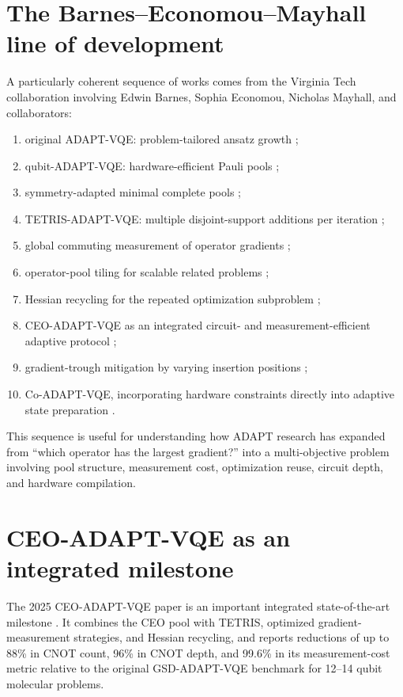\documentclass[11pt]{article}
\begin{document}
\section{The Barnes--Economou--Mayhall line of development}

A particularly coherent sequence of works comes from the Virginia Tech collaboration involving Edwin Barnes, Sophia Economou, Nicholas Mayhall, and collaborators:
\begin{enumerate}[leftmargin=2em]
    \item original ADAPT-VQE: problem-tailored ansatz growth \cite{Grimsley2019};
    \item qubit-ADAPT-VQE: hardware-efficient Pauli pools \cite{Tang2021};
    \item symmetry-adapted minimal complete pools \cite{Shkolnikov2023};
    \item TETRIS-ADAPT-VQE: multiple disjoint-support additions per iteration \cite{Anastasiou2024TETRIS};
    \item global commuting measurement of operator gradients \cite{Anastasiou2023};
    \item operator-pool tiling for scalable related problems \cite{VanDyke2024};
    \item Hessian recycling for the repeated optimization subproblem \cite{Ramoa2025Hessian};
    \item CEO-ADAPT-VQE as an integrated circuit- and measurement-efficient adaptive protocol \cite{Ramoa2025CEO};
    \item gradient-trough mitigation by varying insertion positions \cite{Stadelmann2025};
    \item Co-ADAPT-VQE, incorporating hardware constraints directly into adaptive state preparation \cite{Ramoa2026CoDesign}.
\end{enumerate}
This sequence is useful for understanding how ADAPT research has expanded from ``which operator has the largest gradient?'' into a multi-objective problem involving pool structure, measurement cost, optimization reuse, circuit depth, and hardware compilation.

\section{CEO-ADAPT-VQE as an integrated milestone}

The 2025 CEO-ADAPT-VQE paper is an important integrated state-of-the-art milestone \cite{Ramoa2025CEO}. It combines the CEO pool with TETRIS, optimized gradient-measurement strategies, and Hessian recycling, and reports reductions of up to 88\% in CNOT count, 96\% in CNOT depth, and 99.6\% in its measurement-cost metric relative to the original GSD-ADAPT-VQE benchmark for 12--14 qubit molecular problems.
\end{document}
